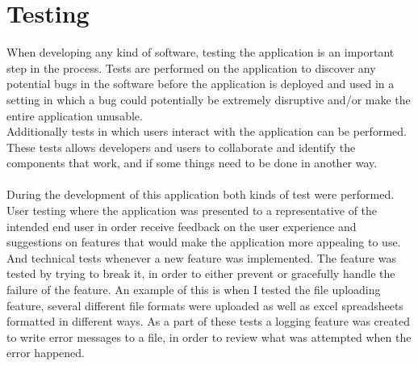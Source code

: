 \section{Testing}\label{test}
When developing any kind of software, testing the application is an important step in the process. Tests are performed on the application to discover any potential bugs in the software before the application is deployed and used in a setting in which a bug could potentially be extremely disruptive and/or make the entire application unusable.
\\Additionally tests in which users interact with the application can be performed. These tests allows developers and users to collaborate and identify the components that work, and if some things need to be done in another way.\\\\
During the development of this application both kinds of test were performed. User testing where the application was presented to a representative of the intended end user in order receive feedback on the user experience and suggestions on features that would make the application more appealing to use.\\
And technical tests whenever a new feature was implemented. The feature was tested by trying to break it, in order to either prevent or gracefully handle the failure of the feature. An example of this is when I tested the file uploading feature, several different file formats were uploaded as well as excel spreadsheets formatted in different ways. As a part of these tests a logging feature was created to write error messages to a file, in order to review what was attempted when the error happened.
